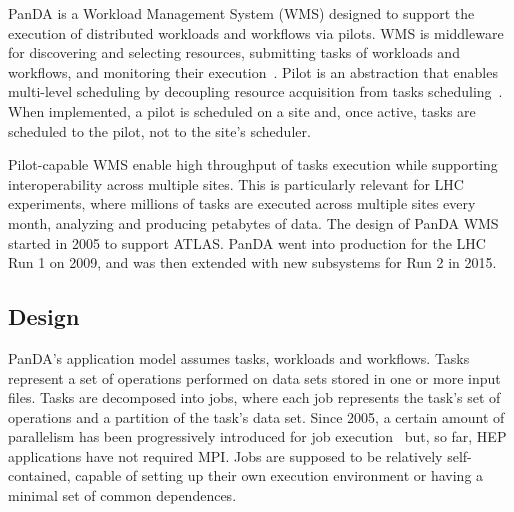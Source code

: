 PanDA is a Workload Management System (WMS) designed to support the execution of
distributed workloads and workflows via pilots. WMS is middleware for
discovering and selecting resources, submitting tasks of workloads and
workflows, and monitoring their execution~\cite{marco2009glite}. Pilot is an
abstraction that enables multi-level scheduling by decoupling resource
acquisition from tasks scheduling~\cite{turilli2015comprehensive}. When
implemented, a pilot is scheduled on a site and, once active, tasks are
scheduled to the pilot, not to the site's scheduler.

Pilot-capable WMS enable high throughput of tasks execution while supporting
interoperability across multiple sites. This is particularly relevant for LHC
experiments, where millions of tasks are executed across multiple sites every
month, analyzing and producing petabytes of data. The design of PanDA WMS
started in 2005 to support ATLAS. PanDA went into
production for the LHC Run 1 on 2009, and was then extended with new subsystems
for Run 2 in 2015.



\subsection{Design}
\label{ssec:panda_design}


PanDA's application model assumes tasks, workloads and workflows. Tasks
represent a set of operations performed on
data sets stored in one or more input files. Tasks are decomposed into jobs,
where each job represents the task's set of operations and a partition of the
task's
data set. Since 2005, a certain amount of parallelism has been
progressively introduced for job execution~\cite{crooks2012multi} but, so far,
HEP applications have not required MPI. Jobs are supposed to be relatively self-contained, capable of setting
up their own execution environment or having a minimal set of common
dependences.

